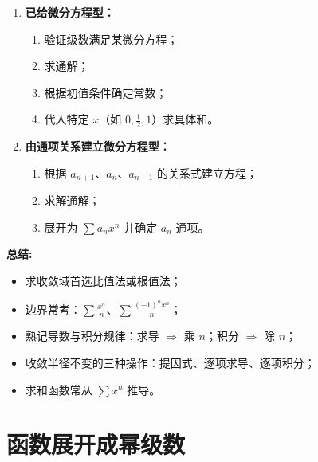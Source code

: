 \begin{enumerate}
    \item \textbf{已给微分方程型：}
          \begin{enumerate}
              \item 验证级数满足某微分方程；
              \item 求通解；
              \item 根据初值条件确定常数；
              \item 代入特定 $x$（如 $0,\frac{1}{2},1$）求具体和。
          \end{enumerate}

    \item \textbf{由通项关系建立微分方程型：}
          \begin{enumerate}
              \item 根据 $a_{n+1}$、$a_n$、$a_{n-1}$ 的关系式建立方程；
              \item 求解通解；
              \item 展开为 $\sum a_n x^n$ 并确定 $a_n$ 通项。
          \end{enumerate}
\end{enumerate}

\textbf{总结:}

\begin{itemize}
    \item 求收敛域首选比值法或根值法；
    \item 边界常考：$\sum \frac{x^n}{n}$、$\sum \frac{(-1)^n x^n}{n}$；
    \item 熟记导数与积分规律：求导 $\Rightarrow$ 乘 $n$；积分 $\Rightarrow$ 除 $n$；
    \item 收敛半径不变的三种操作：提因式、逐项求导、逐项积分；
    \item 求和函数常从 $\sum x^n$ 推导。
\end{itemize}

\section{函数展开成幂级数}

